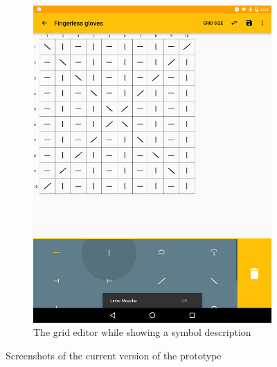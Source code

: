 \begin{figure}[H]
\begin{subfigure}[b]{0.5\textwidth}
	    \includegraphics[width=0.95\linewidth]{images/keyboard_symbol_description_h900.png}
	    \caption[The grid editor while showing a symbol description \protect{}]{The grid editor while showing a symbol description}
	    \label{fig:editor}
	\end{subfigure}
	\caption{Screenshots of the current version of the prototype}
\end{figure}

